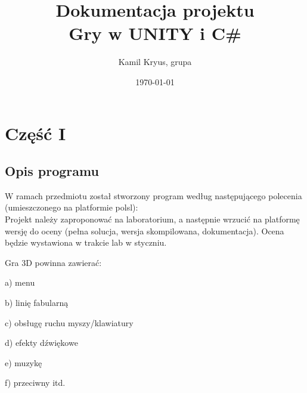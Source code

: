 \documentclass[12pt,a4paper]{article}
\begin{document}
	
	\title{Dokumentacja projektu\\ Gry w UNITY i C\#}
	\author{Kamil Kryus, grupa}
	\date{\today}
	
	\maketitle
	\newpage
	\section*{Część I}
	\subsection*{Opis programu}
	W ramach przedmiotu został stworzony program według następującego polecenia (umieszczonego na platformie polsl): \\
	Projekt należy zaproponować na laboratorium, a następnie wrzucić na platformę wersję do oceny (pełna solucja, wersja skompilowana, dokumentacja). Ocena będzie wystawiona w trakcie lab w styczniu.

Gra 3D powinna zawierać:

a) menu

b) linię fabularną

c) obsługę ruchu myszy/klawiatury

d) efekty dźwiękowe

e) muzykę

f) przeciwny itd.
\end{document}
